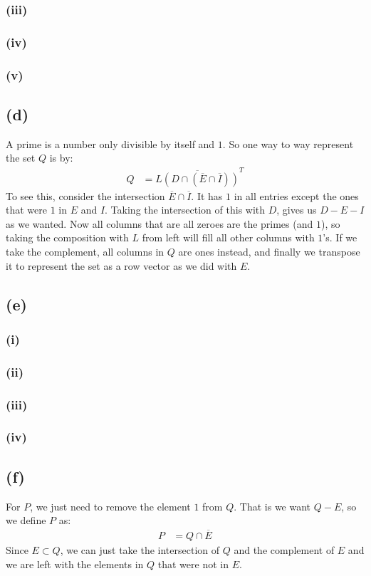 \documentclass[a4paper, fleqn]{article}
\begin{document}
\subsubsection{(iii)}

\subsubsection{(iv)}

\subsubsection{(v)}

\subsection{(d)}
A prime is a number only divisible by itself and $1$. So one way to way represent the set
$Q$ is by:
\begin{align*}
  Q &= \overline{L\left(D\cap \left(\overline{E}\cap \overline{I}\right)\right)}^T
\end{align*}
To see this, consider the intersection $\overline{E}\cap \overline{I}$. It has $1$ in all
entries except the ones that were $1$ in $E$ and $I$. Taking the intersection of this with
$D$, gives us $D-E-I$ as we wanted. Now all columns that are all zeroes are the primes
(and $1$), so taking the composition with $L$ from left will fill all other columns with
$1$'s. If we take the complement, all columns in $Q$ are ones instead, and finally we transpose it to represent the set as a row vector as we did with $E$.

\subsection{(e)}
\subsubsection{(i)}
\subsubsection{(ii)}
\subsubsection{(iii)}
\subsubsection{(iv)}

\subsection{(f)}
For $P$, we just need to remove the element $1$ from $Q$. That is we want $Q-E$, so we
define $P$ as:
\begin{align*}
  P&=Q\cap \overline{E}
\end{align*}
Since $E\subset Q$, we can just take the intersection of $Q$  and the complement of $E$
and we are left with the elements in $Q$ that were not in $E$.
\end{document}
